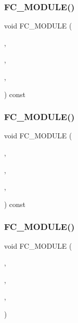 \subsubsection{\texorpdfstring{F\+C\+\_\+\+M\+O\+D\+U\+L\+E()}{FC\_MODULE()}\hspace{0.1cm}{\footnotesize\ttfamily [14/26]}}
{\footnotesize\ttfamily void F\+C\+\_\+\+M\+O\+D\+U\+LE (\begin{DoxyParamCaption}\item[{simple}]{,  }\item[{zaxy}]{,  }\item[{S\+I\+M\+P\+LE}]{,  }\item[{Z\+A\+XY}]{ }\end{DoxyParamCaption}) const}

\hypertarget{SimpleKernels_8H_a237a6451d95d7423ca050660f012939e}{}\label{SimpleKernels_8H_a237a6451d95d7423ca050660f012939e} 
\subsubsection{\texorpdfstring{F\+C\+\_\+\+M\+O\+D\+U\+L\+E()}{FC\_MODULE()}\hspace{0.1cm}{\footnotesize\ttfamily [15/26]}}
{\footnotesize\ttfamily void F\+C\+\_\+\+M\+O\+D\+U\+LE (\begin{DoxyParamCaption}\item[{simple}]{,  }\item[{yxy}]{,  }\item[{S\+I\+M\+P\+LE}]{,  }\item[{Y\+XY}]{ }\end{DoxyParamCaption}) const}

\hypertarget{SimpleKernels_8H_ac72c5cfb6e621693206556a7aa45da0b}{}\label{SimpleKernels_8H_ac72c5cfb6e621693206556a7aa45da0b} 
\subsubsection{\texorpdfstring{F\+C\+\_\+\+M\+O\+D\+U\+L\+E()}{FC\_MODULE()}\hspace{0.1cm}{\footnotesize\ttfamily [16/26]}}
{\footnotesize\ttfamily void F\+C\+\_\+\+M\+O\+D\+U\+LE (\begin{DoxyParamCaption}\item[{simple}]{,  }\item[{zwxpy}]{,  }\item[{S\+I\+M\+P\+LE}]{,  }\item[{Z\+W\+X\+PY}]{ }\end{DoxyParamCaption})}

